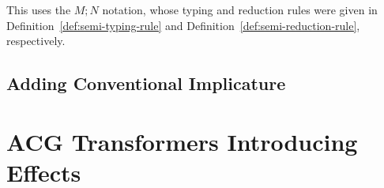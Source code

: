 This uses the $M; N$ notation, whose typing and reduction rules were given
in Definition~\ref{def:semi-typing-rule} and
Definition~\ref{def:semi-reduction-rule}, respectively.


\subsection{Adding Conventional Implicature}
\label{ssec:adding-conventional-implicature}




\section{ACG Transformers Introducing Effects}

